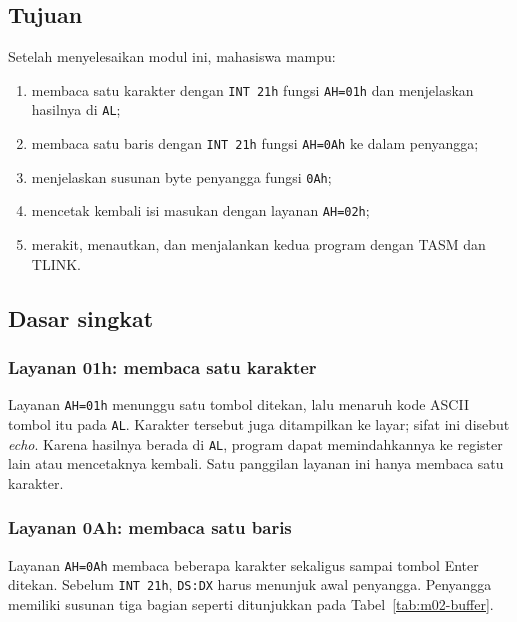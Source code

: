 
\subsection{Tujuan}

\begin{tujuan}
Setelah menyelesaikan modul ini, mahasiswa mampu:
\begin{enumerate}
    \item membaca satu karakter dengan \texttt{INT 21h} fungsi
          \texttt{AH=01h} dan menjelaskan hasilnya di \texttt{AL};
    \item membaca satu baris dengan \texttt{INT 21h} fungsi
          \texttt{AH=0Ah} ke dalam penyangga;
    \item menjelaskan susunan byte penyangga fungsi \texttt{0Ah};
    \item mencetak kembali isi masukan dengan layanan \texttt{AH=02h};
    \item merakit, menautkan, dan menjalankan kedua program dengan
          TASM dan TLINK.
\end{enumerate}
\end{tujuan}

\subsection{Dasar singkat}

\subsubsection*{Layanan 01h: membaca satu karakter}

Layanan \texttt{AH=01h} menunggu satu tombol ditekan, lalu menaruh
kode ASCII tombol itu pada \texttt{AL}. Karakter tersebut juga
ditampilkan ke layar; sifat ini disebut \emph{echo}. Karena hasilnya
berada di \texttt{AL}, program dapat memindahkannya ke register lain
atau mencetaknya kembali. Satu panggilan layanan ini hanya membaca
satu karakter.

\subsubsection*{Layanan 0Ah: membaca satu baris}

Layanan \texttt{AH=0Ah} membaca beberapa karakter sekaligus sampai
tombol Enter ditekan. Sebelum \texttt{INT 21h}, \texttt{DS:DX} harus
menunjuk awal penyangga. Penyangga memiliki susunan tiga bagian
seperti ditunjukkan pada Tabel~\ref{tab:m02-buffer}.

